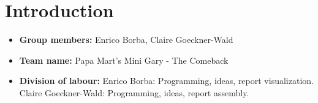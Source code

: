 
\newif\ifshowsolutions
\showsolutionstrue

\newcommand{\boldline}[1]{\underline{\textbf{#1}}}

\usepackage{graphicx}
\graphicspath{ {images/} }



\pagestyle{fancy}





\section{Introduction}
\medskip
\begin{itemize}

    \item \textbf{Group members:} Enrico Borba, Claire Goeckner-Wald
    \item \textbf{Team name:} Papa Mart's Mini Gary - The Comeback
    \item \textbf{Division of labour:}
        Enrico Borba: Programming, ideas, report visualization.
        Claire Goeckner-Wald: Programming, ideas, report assembly.

\end{itemize}


